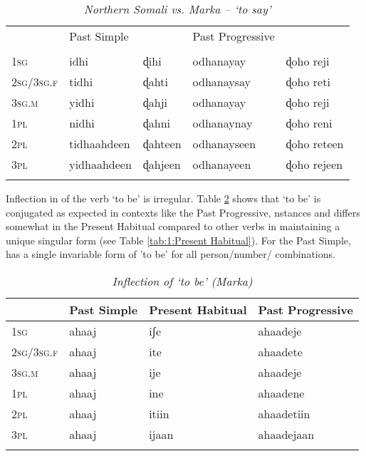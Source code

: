 \documentclass[output=paper]{../langsci/langscibook}
\begin{document}
 \begin{table}
 	\caption{\textit{Northern Somali vs. Marka -- `to say'}}
 	\label{tab:1:Irregular Verbs}
 	\begin{tabularx}{\textwidth}{Xllll} 
 		\lsptoprule
 		& Past Simple   &   & Past Progressive &    \\
 		& \ili{Somali} & \ili{Marka} & \ili{Somali} & \ili{Marka} \\ 
 		\midrule
 		1\textsc{sg} & idhi & ɖihi & odhanayay & ɖoho reji \\
 		2\textsc{sg}/3\textsc{sg.f} & tidhi  & ɖahti & odhanaysay  & ɖoho reti  \\
 		3\textsc{sg.m} & yidhi & ɖahji & odhanayay & ɖoho reji \\
 		1\textsc{pl} & nidhi & ɖahni & odhanaynay & ɖoho reni \\
 		2\textsc{pl} & tidhaahdeen & ɖahteen & odhanayseen & ɖoho reteen \\
 		3\textsc{pl} & yidhaahdeen & ɖahjeen & odhanayeen & ɖoho rejeen \\
 		\lspbottomrule
 	\end{tabularx}
 \end{table}
 
 Inflection in  of the verb  `to be' is irregular. Table \ref{tab:1:ToBe} shows that `to be' is conjugated as expected in  contexts like the Past Progressive, nstances and differs somewhat in the Present Habitual compared to other verbs in maintaining a unique  singular  form (see Table \ref{tab:1:Present Habitual}). For the Past Simple,  has a single invariable form of 'to be' for all person/number/ combinations.
 
  \begin{table}
 	\caption{\textit{Inflection of `to be' (Marka)}}
 	\label{tab:1:ToBe}
 	\begin{tabularx}{\textwidth}{Xlll} 
 		\lsptoprule
 		& Past Simple   &  Present Habitual & Past Progressive    \\  
 		\midrule
 		1\textsc{sg} & ahaaj & iʃe & ahaadeje \\
 		2\textsc{sg}/3\textsc{sg.f} & ahaaj  & ite & ahaadete   \\
 		3\textsc{sg.m} & ahaaj & ije & ahaadeje  \\
 		1\textsc{pl} & ahaaj & ine & ahaadene  \\
 		2\textsc{pl} & ahaaj & itiin & ahaadetiin  \\
 		3\textsc{pl} & ahaaj & ijaan & ahaadejaan \\
 		\lspbottomrule
 	\end{tabularx}
 \end{table}
 
\end{document}
